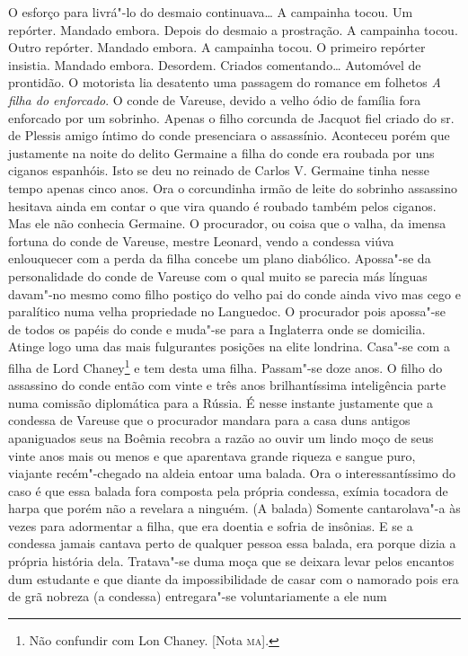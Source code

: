 \begin{linenumbers}
O esforço para livrá"-lo do desmaio continuava\ldots{} A campainha tocou. Um
repórter. Mandado embora. Depois do desmaio a prostração. A campainha
tocou. Outro repórter. Mandado embora. A campainha tocou. O primeiro
repórter insistia. Mandado embora. Desordem. Criados comentando\ldots{}
Automóvel de prontidão. O motorista lia desatento uma passagem do
romance em folhetos \emph{A filha do enforcado}. O conde de Vareuse,
devido a velho ódio de família fora enforcado por um sobrinho. Apenas o
filho corcunda de Jacquot fiel criado do sr.\,de Plessis amigo íntimo do
conde presenciara o assassínio. Aconteceu porém que justamente na noite
do delito Germaine a filha do conde era roubada por uns ciganos
espanhóis. Isto se deu no reinado de Carlos V. Germaine tinha nesse
tempo apenas cinco anos. Ora o corcundinha irmão de leite do sobrinho
assassino hesitava ainda em contar o que vira quando é roubado também
pelos ciganos. Mas ele não conhecia Germaine. O procurador, ou coisa que
o valha, da imensa fortuna do conde de Vareuse, mestre Leonard, vendo a
condessa viúva enlouquecer com a perda da filha concebe um plano
diabólico. Apossa"-se da personalidade do conde de Vareuse com o qual
muito se parecia más línguas davam"-no mesmo como filho postiço do velho
pai do conde ainda vivo mas cego e paralítico numa velha propriedade no
Languedoc. O procurador pois apossa"-se de todos os papéis do conde e
muda"-se para a Inglaterra onde se domicilia. Atinge logo uma das mais
fulgurantes posições na elite londrina. Casa"-se com a filha de Lord
Chaney\footnote{Não confundir com Lon Chaney. {[}Nota \textsc{ma}{]}.} e tem
desta uma filha. Passam"-se doze anos. O filho do assassino do conde
então com vinte e três anos brilhantíssima inteligência parte numa
comissão diplomática para a Rússia. É nesse instante justamente que a
condessa de Vareuse que o procurador mandara para a casa duns antigos
apaniguados seus na Boêmia recobra a razão ao ouvir um lindo moço de
seus vinte anos mais ou menos e que aparentava grande riqueza e sangue
puro, viajante recém"-chegado na aldeia entoar uma balada. Ora o
interessantíssimo do caso é que essa balada fora composta pela própria
condessa, exímia tocadora de harpa que porém não a revelara a ninguém.
(A balada) Somente cantarolava"-a às vezes para adormentar a filha, que
era doentia e sofria de insônias. E se a condessa jamais cantava perto
de qualquer pessoa essa balada, era porque dizia a própria história
dela. Tratava"-se duma moça que se deixara levar pelos encantos dum
estudante e que diante da impossibilidade de casar com o namorado pois
era de grã nobreza (a condessa) entregara"-se voluntariamente a ele num

\end{linenumbers}
